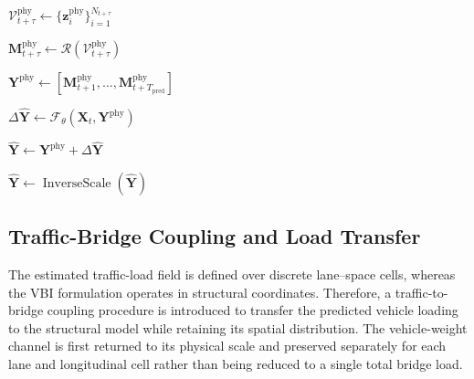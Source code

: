 \documentclass[journal]{IEEEtran}
\begin{document}
\begin{algorithm}[!htbp]
{    $\mathcal{V}^{\mathrm{phy}}_{t+\tau}
    \leftarrow
    \{
    \mathbf{z}_{i}^{\mathrm{phy}}
    \}_{i=1}^{N_{t+\tau}}$\;

    $\mathbf{M}^{\mathrm{phy}}_{t+\tau}
    \leftarrow
    \mathcal{R}
    \left(
    \mathcal{V}^{\mathrm{phy}}_{t+\tau}
    \right)$\;
}

$\mathbf{Y}^{\mathrm{phy}}
\leftarrow
[
\mathbf{M}^{\mathrm{phy}}_{t+1},
\ldots,
\mathbf{M}^{\mathrm{phy}}_{t+T_{\mathrm{pred}}}
]$\;

$\Delta\widehat{\mathbf{Y}}
\leftarrow
\mathcal{F}_{\theta}
\left(
\mathbf{X}_{t},
\mathbf{Y}^{\mathrm{phy}}
\right)$\;

$\widehat{\mathbf{Y}}
\leftarrow
\mathbf{Y}^{\mathrm{phy}}
+
\Delta\widehat{\mathbf{Y}}$\;


$\widehat{\mathbf{Y}}
\leftarrow
\operatorname{InverseScale}
\left(
\widehat{\mathbf{Y}}
\right)$\;

\;

\end{algorithm}



\subsection{Traffic-Bridge Coupling and Load Transfer}
\label{sec:traffic_bridge_transfer}

The estimated traffic-load field is defined over discrete lane--space cells, whereas the VBI formulation operates in structural coordinates. Therefore, a traffic-to-bridge coupling procedure is introduced to transfer the predicted vehicle loading to the structural model while retaining its spatial distribution. The vehicle-weight channel is first returned to its physical scale and preserved separately for each lane and longitudinal cell rather than being reduced to a single total bridge load.
\end{document}
